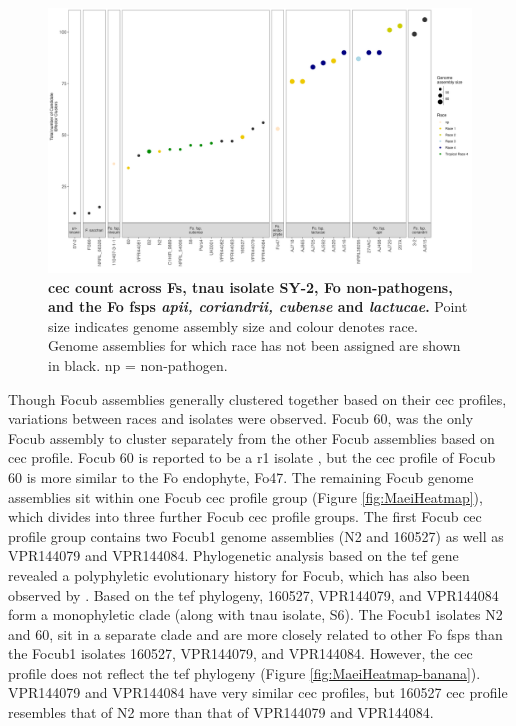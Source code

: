 \begin{figure}
    \centering
    \includegraphics[width=20cm]{Figures/CecDistribinFspOfInterest.png}
    \captionsetup{width=20cm}
    \caption[\Acl{cec} count across \acl{Fs}, \ac{tnau} isolate SY-2, \acl{Fo} non-pathogens, and the \ac{Fo} \acp{fsp} \textit{apii, coriandrii, cubense} and \textit{lactucae}.]{\textbf{\Acf{cec} count across \acl{Fs}, \ac{tnau} isolate SY-2, \acf{Fo} non-pathogens, and the \ac{Fo} \acp{fsp} \textit{apii, coriandrii, cubense} and \textit{lactucae}.} Point size indicates genome assembly size and colour denotes race. Genome assemblies for which race has not been assigned are shown in black. np = non-pathogen.}
    \label{fig:CECcount}
\end{figure}

Though \ac{Focub} assemblies generally clustered together based on their \ac{cec} profiles, variations between races and isolates were observed. \ac{Focub} 60, was the only \ac{Focub} assembly to cluster separately from the other \ac{Focub} assemblies based on \ac{cec} profile. \ac{Focub} 60 is reported to be a \ac{r1} isolate \parencite{Yun2019}, but the \ac{cec} profile of \ac{Focub} 60 is more similar to the \ac{Fo} endophyte, Fo47. The remaining \ac{Focub} genome assemblies sit within one \ac{Focub} \ac{cec} profile group (Figure \ref{fig:MaeiHeatmap}), which divides into three further \ac{Focub} \ac{cec} profile groups. The first \ac{Focub} \ac{cec} profile group contains two \ac{Focub1} genome assemblies (N2 and 160527) as well as VPR144079 and VPR144084. Phylogenetic analysis based on the \ac{tef} gene revealed a polyphyletic evolutionary history for \ac{Focub}, which has also been observed by \textcite{Maryani2019, Mostert2022}. Based on the \ac{tef} phylogeny, 160527, VPR144079, and VPR144084 form a monophyletic clade (along with \ac{tnau} isolate, S6). The \ac{Focub1} isolates N2 and 60, sit in a separate clade and are more closely related to other \ac{Fo} \acp{fsp} than the \ac{Focub1} isolates 160527, VPR144079, and VPR144084. However, the \ac{cec} profile does not reflect the \ac{tef} phylogeny (Figure \ref{fig:MaeiHeatmap-banana}). VPR144079 and VPR144084 have very similar \ac{cec} profiles, but 160527 \ac{cec} profile resembles that of N2 more than that of VPR144079 and VPR144084. 

